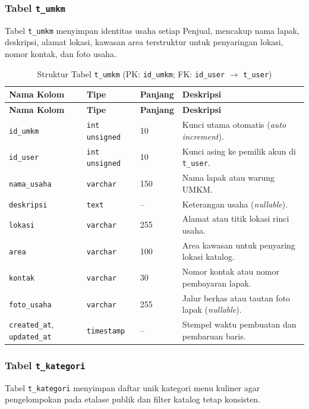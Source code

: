 \subsubsection{Tabel \texttt{t\_umkm}}
Tabel \texttt{t\_umkm} menyimpan identitas usaha setiap Penjual, mencakup nama lapak, deskripsi, alamat lokasi, kawasan area terstruktur untuk penyaringan lokasi, nomor kontak, dan foto usaha.

\renewcommand{\arraystretch}{1.20}
\begin{longtable}{|L{3.85cm}|L{2.4cm}|C{1.65cm}|L{\dimexpr\textwidth-3.85cm-2.4cm-1.65cm-8\arrayrulewidth\relax}|}
\caption{Struktur Tabel \texttt{t\_umkm} (PK: \texttt{id\_umkm}; FK: \texttt{id\_user} $\rightarrow$ \texttt{t\_user})}
\label{tab:skema-umkm} \\
\hline
{}
\textbf{Nama Kolom} & \textbf{Tipe} & \textbf{Panjang} & \textbf{Deskripsi} \\
\hline
\endfirsthead
\hline
{}
\textbf{Nama Kolom} & \textbf{Tipe} & \textbf{Panjang} & \textbf{Deskripsi} \\
\hline
\endhead
\hline
\endfoot
\texttt{id\_umkm} & \texttt{int unsigned} & 10 & Kunci utama otomatis (\textit{auto increment}). \\
\hline
\texttt{id\_user} & \texttt{int unsigned} & 10 & Kunci asing ke pemilik akun di \texttt{t\_user}. \\
\hline
\texttt{nama\_usaha} & \texttt{varchar} & 150 & Nama lapak atau warung UMKM. \\
\hline
\texttt{deskripsi} & \texttt{text} & -- & Keterangan usaha (\textit{nullable}). \\
\hline
\texttt{lokasi} & \texttt{varchar} & 255 & Alamat atau titik lokasi rinci usaha. \\
\hline
\texttt{area} & \texttt{varchar} & 100 & Area kawasan untuk penyaring lokasi katalog. \\
\hline
\texttt{kontak} & \texttt{varchar} & 30 & Nomor kontak atau nomor pembayaran lapak. \\
\hline
\texttt{foto\_usaha} & \texttt{varchar} & 255 & Jalur berkas atau tautan foto lapak (\textit{nullable}). \\
\hline
\texttt{created\_at}, \texttt{updated\_at} & \texttt{timestamp} & -- & Stempel waktu pembuatan dan pembaruan baris. \\
\hline
\end{longtable}

\subsubsection{Tabel \texttt{t\_kategori}}
Tabel \texttt{t\_kategori} menyimpan daftar unik kategori menu kuliner agar pengelompokan pada etalase publik dan filter katalog tetap konsisten.

